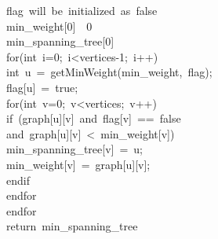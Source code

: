 \documentclass[conference]{IEEEtran}
\begin{document}
\hspace*{7mm}flag\ will\ be\ initialized\ as\ false\\
\hspace*{7mm}min\_weight[0]\ \leftarrow\ 0\\
\hspace*{7mm}min\_spanning\_tree[0]\ \\
\hspace*{7mm}for(int\ i=0;\ i<vertices-1;\ i++)\\
\hspace*{10mm}int\ u\ =\ getMinWeight(min\_weight,\ flag);\\
\hspace*{10mm}flag[u]\ =\ true;\\
\hspace*{10mm}for(int\ v=0;\ v<vertices;\ v++)\\
\hspace*{13mm}if\ (graph[u][v]\ and\ flag[v]\ ==\ false\\
\hspace*{17mm}and\ graph[u][v]\ <\ min\_weight[v])\\
\hspace*{16mm}min\_spanning\_tree[v]\ =\ u;\\
\hspace*{16mm}min\_weight[v]\ =\ graph[u][v];\\
\hspace*{13mm}endif\\
\hspace*{10mm}endfor\\
\hspace*{7mm}endfor\\
\hspace*{7mm}return\ min\_spanning\_tree\\
\end{document}
